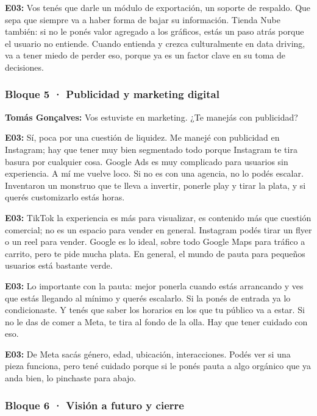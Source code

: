 \noindent\textbf{E03:} Vos tenés que darle un módulo de exportación, un soporte de respaldo. Que sepa que siempre va a haber forma de bajar su información. Tienda Nube también: si no le ponés valor agregado a los gráficos, estás un paso atrás porque el usuario no entiende. Cuando entienda y crezca culturalmente en data driving, va a tener miedo de perder eso, porque ya es un factor clave en su toma de decisiones.

\subsubsection*{Bloque 5 · Publicidad y marketing digital}

\noindent\textbf{Tomás Gonçalves:} Vos estuviste en marketing. ¿Te manejás con publicidad?

\noindent\textbf{E03:} Sí, poca por una cuestión de liquidez. Me manejé con publicidad en Instagram; hay que tener muy bien segmentado todo porque Instagram te tira basura por cualquier cosa. Google Ads es muy complicado para usuarios sin experiencia. A mí me vuelve loco. Si no es con una agencia, no lo podés escalar. Inventaron un monstruo que te lleva a invertir, ponerle play y tirar la plata, y si querés customizarlo estás horas.

\noindent\textbf{E03:} TikTok la experiencia es más para visualizar, es contenido más que cuestión comercial; no es un espacio para vender en general. Instagram podés tirar un flyer o un reel para vender. Google es lo ideal, sobre todo Google Maps para tráfico a carrito, pero te pide mucha plata. En general, el mundo de pauta para pequeños usuarios está bastante verde.

\noindent\textbf{E03:} Lo importante con la pauta: mejor ponerla cuando estás arrancando y ves que estás llegando al mínimo y querés escalarlo. Si la ponés de entrada ya lo condicionaste. Y tenés que saber los horarios en los que tu público va a estar. Si no le das de comer a Meta, te tira al fondo de la olla. Hay que tener cuidado con eso.

\noindent\textbf{E03:} De Meta sacás género, edad, ubicación, interacciones. Podés ver si una pieza funciona, pero tené cuidado porque si le ponés pauta a algo orgánico que ya anda bien, lo pinchaste para abajo.

\subsubsection*{Bloque 6 · Visión a futuro y cierre}

